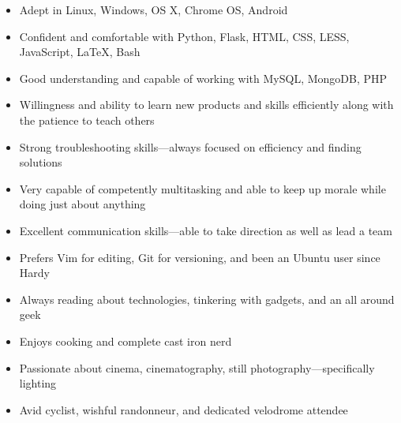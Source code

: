 \documentclass[letterpaper]{article}        %
\begin{document}
  \begin{multicols}{2}
    \begin{itemize}
    
    \item Adept in Linux, Windows, OS X, Chrome OS, Android
    
    \item Confident and comfortable with Python, Flask, HTML, CSS, LESS, JavaScript, \LaTeX{}, Bash
    
    \item Good understanding and capable of working with MySQL, MongoDB, PHP
    
    \item Willingness and ability to learn new products and skills efficiently along with the patience to teach others
    
    \item Strong troubleshooting skills---always focused on efficiency and finding solutions
    
    \item Very capable of competently multitasking and able to keep up morale while doing just about anything
    
    \item Excellent communication skills---able to take direction as well as lead a team
    
    \item Prefers Vim for editing, Git for versioning, and been an Ubuntu user since Hardy
    
    \item Always reading about technologies, tinkering with gadgets, and an all around geek
    
    \item Enjoys cooking and complete cast iron nerd
    
    \item Passionate about cinema, cinematography, still photography---specifically lighting
    
    \item Avid cyclist, wishful randonneur, and dedicated velodrome attendee
    
    \end{itemize}
  \end{multicols}
\end{document}
